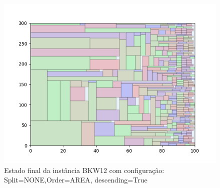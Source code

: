 \begin{figure}[H]
    \centering
    \caption[]{Estado final da instância BKW12 com configuração: Split=NONE,Order=AREA, descending=True}
    \label{fig:bkw12-none-area-true}
    \includegraphics[scale=0.5]{output/figures/bkw/bkw12/none/area/true/000}
\end{figure}